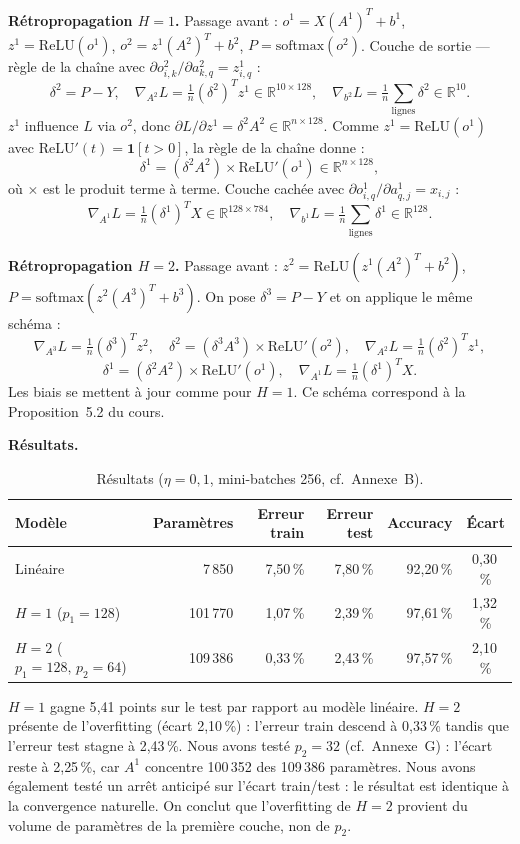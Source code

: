 \documentclass[10pt,a4paper]{article}
\begin{document}
\textbf{Rétropropagation $H=1$.}
Passage avant :
$o^1=X(A^1)^T+b^1$, $z^1=\mathrm{ReLU}(o^1)$,
$o^2=z^1(A^2)^T+b^2$, $P=\mathrm{softmax}(o^2)$.
Couche de sortie --- règle de la chaîne avec $\partial o^2_{i,k}/\partial a^2_{k,q}=z^1_{i,q}$ :
\[
\delta^2=P-Y,\quad
\boxed{\nabla_{A^2}L=\tfrac{1}{n}(\delta^2)^Tz^1\in\mathbb{R}^{10\times128}},\quad
\boxed{\nabla_{b^2}L=\tfrac{1}{n}\textstyle\sum_{\text{lignes}}\delta^2\in\mathbb{R}^{10}.}
\]
$z^1$ influence $L$ via $o^2$, donc $\partial L/\partial z^1=\delta^2 A^2\in\mathbb{R}^{n\times128}$.
Comme $z^1=\mathrm{ReLU}(o^1)$ avec $\mathrm{ReLU}'(t)=\mathbf{1}[t>0]$,
la règle de la chaîne donne :
\[
\delta^1=(\delta^2 A^2)\times\mathrm{ReLU}'(o^1)\in\mathbb{R}^{n\times128},
\]
où $\times$ est le produit terme à terme.
Couche cachée avec $\partial o^1_{i,q}/\partial a^1_{q,j}=x_{i,j}$ :
\[
\boxed{\nabla_{A^1}L=\tfrac{1}{n}(\delta^1)^TX\in\mathbb{R}^{128\times784}},\quad
\boxed{\nabla_{b^1}L=\tfrac{1}{n}\textstyle\sum_{\text{lignes}}\delta^1\in\mathbb{R}^{128}.}
\]

\textbf{Rétropropagation $H=2$.}
Passage avant :
$z^2=\mathrm{ReLU}(z^1(A^2)^T+b^2)$, $P=\mathrm{softmax}(z^2(A^3)^T+b^3)$.
On pose $\delta^3=P-Y$ et on applique le même schéma :
\[
\boxed{\nabla_{A^3}L=\tfrac{1}{n}(\delta^3)^Tz^2},\quad
\delta^2=(\delta^3 A^3)\times\mathrm{ReLU}'(o^2),\quad
\boxed{\nabla_{A^2}L=\tfrac{1}{n}(\delta^2)^Tz^1},
\]
\[
\delta^1=(\delta^2 A^2)\times\mathrm{ReLU}'(o^1),\quad
\boxed{\nabla_{A^1}L=\tfrac{1}{n}(\delta^1)^TX}.
\]
Les biais se mettent à jour comme pour $H=1$.
Ce schéma correspond à la Proposition~5.2 du cours.

\textbf{Résultats.}

\begin{table}[H]
\centering\small
\begin{tabular}{lrrrrc}
\toprule
Modèle & Paramètres & Erreur train & Erreur test & Accuracy & Écart \\
\midrule
Linéaire & 7\,850 & 7{,}50\,\% & 7{,}80\,\% & 92{,}20\,\% & 0{,}30\,\% \\
$H=1$ ($p_1=128$) & 101\,770 & 1{,}07\,\% & 2{,}39\,\% & 97{,}61\,\% & 1{,}32\,\% \\
$H=2$ ($p_1=128,\,p_2=64$) & 109\,386 & 0{,}33\,\% & 2{,}43\,\% & 97{,}57\,\% & 2{,}10\,\% \\
\bottomrule
\end{tabular}
\caption{Résultats ($\eta=0{,}1$, mini-batches 256, cf.~Annexe~B).}
\end{table}

$H=1$ gagne 5{,}41 points sur le test par rapport au modèle linéaire.
$H=2$ présente de l'overfitting (écart 2{,}10\,\%) : l'erreur train descend à 0{,}33\,\%
tandis que l'erreur test stagne à 2{,}43\,\%.
Nous avons testé $p_2=32$ (cf.~Annexe~G) : l'écart reste à 2{,}25\,\%,
car $A^1$ concentre 100\,352 des 109\,386 paramètres.
Nous avons également testé un arrêt anticipé sur l'écart train/test :
le résultat est identique à la convergence naturelle.
On conclut que l'overfitting de $H=2$ provient du volume de paramètres
de la première couche, non de $p_2$.
\end{document}
